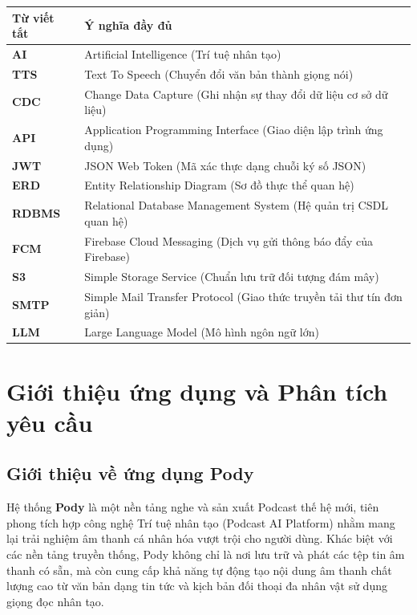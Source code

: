 \documentclass[12pt,a4paper]{report}
\begin{document}
\begin{table}[h!]
\centering
\begin{tabular}{p{3cm} p{11cm}}
\toprule
\textbf{Từ viết tắt} & \textbf{Ý nghĩa đầy đủ} \\
\midrule
\textbf{AI} & Artificial Intelligence (Trí tuệ nhân tạo) \\
\textbf{TTS} & Text To Speech (Chuyển đổi văn bản thành giọng nói) \\
\textbf{CDC} & Change Data Capture (Ghi nhận sự thay đổi dữ liệu cơ sở dữ liệu) \\
\textbf{API} & Application Programming Interface (Giao diện lập trình ứng dụng) \\
\textbf{JWT} & JSON Web Token (Mã xác thực dạng chuỗi ký số JSON) \\
\textbf{ERD} & Entity Relationship Diagram (Sơ đồ thực thể quan hệ) \\
\textbf{RDBMS} & Relational Database Management System (Hệ quản trị CSDL quan hệ) \\
\textbf{FCM} & Firebase Cloud Messaging (Dịch vụ gửi thông báo đẩy của Firebase) \\
\textbf{S3} & Simple Storage Service (Chuẩn lưu trữ đối tượng đám mây) \\
\textbf{SMTP} & Simple Mail Transfer Protocol (Giao thức truyền tải thư tín đơn giản) \\
\textbf{LLM} & Large Language Model (Mô hình ngôn ngữ lớn) \\
\bottomrule
\end{tabular}
\end{table}

\newpage

\chapter{Giới thiệu ứng dụng và Phân tích yêu cầu}

\section{Giới thiệu về ứng dụng Pody}
Hệ thống \textbf{Pody} là một nền tảng nghe và sản xuất Podcast thế hệ mới, tiên phong tích hợp công nghệ Trí tuệ nhân tạo (Podcast AI Platform) nhằm mang lại trải nghiệm âm thanh cá nhân hóa vượt trội cho người dùng. Khác biệt với các nền tảng truyền thống, Pody không chỉ là nơi lưu trữ và phát các tệp tin âm thanh có sẵn, mà còn cung cấp khả năng tự động tạo nội dung âm thanh chất lượng cao từ văn bản dạng tin tức và kịch bản đối thoại đa nhân vật sử dụng giọng đọc nhân tạo.
\end{document}
